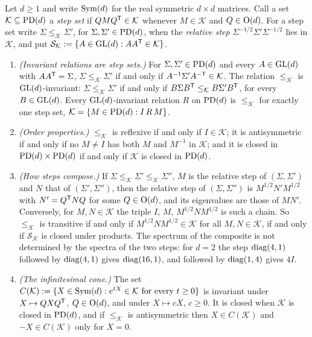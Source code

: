 \begin{proposition}\label{prop:invariant-orders}
Let $d \ge 1$ and write $\mathrm{Sym}(d)$ for the real symmetric $d \times d$ matrices. Call a set
$\mathcal K \subseteq \mathrm{PD}(d)$ a \emph{step set} if $QMQ^{\mathsf{T}} \in \mathcal K$ whenever $M \in \mathcal K$
and $Q \in \mathrm{O}(d)$. For a step set write $\Sigma \le_{\mathcal K} \Sigma'$, for
$\Sigma, \Sigma' \in \mathrm{PD}(d)$, when the \emph{relative step} $\Sigma^{-1/2}\Sigma'\Sigma^{-1/2}$ lies in
$\mathcal K$, and put $\mathcal S_{\mathcal K} := \{A \in \mathrm{GL}(d) : AA^{\mathsf{T}} \in \mathcal K\}$.
\begin{enumerate}
\item \emph{(Invariant relations are step sets.)} For $\Sigma, \Sigma' \in \mathrm{PD}(d)$ and every
$A \in \mathrm{GL}(d)$ with $AA^{\mathsf{T}} = \Sigma$, $\Sigma \le_{\mathcal K} \Sigma'$ if and only if
$A^{-1}\Sigma'A^{-\mathsf{T}} \in \mathcal K$. The relation $\le_{\mathcal K}$ is $\mathrm{GL}(d)$-invariant:
$\Sigma \le_{\mathcal K} \Sigma'$ if and only if $B\Sigma B^{\mathsf{T}} \le_{\mathcal K} B\Sigma'B^{\mathsf{T}}$, for
every $B \in \mathrm{GL}(d)$. Every $\mathrm{GL}(d)$-invariant relation $R$ on $\mathrm{PD}(d)$ is $\le_{\mathcal K}$ for
exactly one step set, $\mathcal K = \{M \in \mathrm{PD}(d) : I \,R\,M\}$.
\item \emph{(Order properties.)} $\le_{\mathcal K}$ is reflexive if and only if $I \in \mathcal K$; it is
antisymmetric if and only if no $M \ne I$ has both $M$ and $M^{-1}$ in $\mathcal K$; and it is closed in
$\mathrm{PD}(d) \times \mathrm{PD}(d)$ if and only if $\mathcal K$ is closed in $\mathrm{PD}(d)$.
\item \emph{(How steps compose.)} If $\Sigma \le_{\mathcal K} \Sigma' \le_{\mathcal K} \Sigma''$, $M$ is
the relative step of $(\Sigma, \Sigma')$ and $N$ that of $(\Sigma', \Sigma'')$, then the relative step
of $(\Sigma, \Sigma'')$ is $M^{1/2}N'M^{1/2}$ with $N' = Q^{\mathsf{T}}NQ$ for some $Q \in \mathrm{O}(d)$, and its
eigenvalues are those of $MN'$. Conversely, for $M, N \in \mathcal K$ the triple $I$, $M$,
$M^{1/2}NM^{1/2}$ is such a chain. So $\le_{\mathcal K}$ is transitive if and only if
$M^{1/2}NM^{1/2} \in \mathcal K$ for all $M, N \in \mathcal K$, if and only if $\mathcal S_{\mathcal K}$
is closed under products. The spectrum of the composite is not determined by the spectra of the two
steps: for $d = 2$ the step $\operatorname{diag}(4,1)$ followed by $\operatorname{diag}(4,1)$ gives $\operatorname{diag}(16,1)$, and followed by
$\operatorname{diag}(1,4)$ gives $4I$.
\item \emph{(The infinitesimal cone.)} The set
$C(\mathcal K) := \{X \in \mathrm{Sym}(d) : e^{tX} \in \mathcal K \text{ for every } t \ge 0\}$ is invariant
under $X \mapsto QXQ^{\mathsf{T}}$, $Q \in \mathrm{O}(d)$, and under $X \mapsto cX$, $c \ge 0$. It is closed when
$\mathcal K$ is closed in $\mathrm{PD}(d)$, and if $\le_{\mathcal K}$ is antisymmetric then
$X \in C(\mathcal K)$ and $-X \in C(\mathcal K)$ only for $X = 0$.
\end{enumerate}
\end{proposition}


